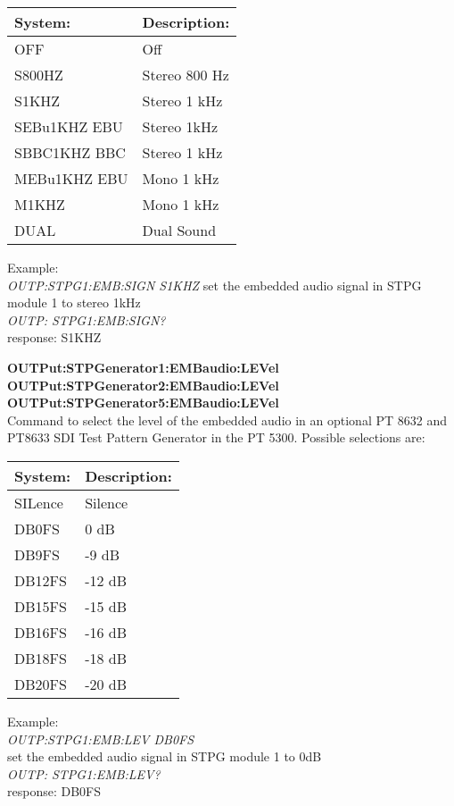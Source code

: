 \begin{tabular}{|l|l|}
\hline
System:		& Description: \\ \hline
OFF				& Off \\ \hline
S800HZ		& Stereo 800 Hz \\ \hline 
S1KHZ			& Stereo 1 kHz\\ \hline
SEBu1KHZ EBU	& Stereo 1kHz\\ \hline
SBBC1KHZ BBC	& Stereo 1 kHz\\ \hline
MEBu1KHZ EBU	& Mono 1 kHz\\ \hline
M1KHZ			& Mono 1 kHz\\ \hline
DUAL			& Dual Sound\\ \hline
\end{tabular}

Example:\\
\textit{OUTP:STPG1:EMB:SIGN S1KHZ}
set the embedded audio signal in STPG module 1 to stereo 1kHz\\
\textit{OUTP: STPG1:EMB:SIGN?}\\
response: S1KHZ

\textbf{OUTPut:STPGenerator1:EMBaudio:LEVel}\\
\textbf{OUTPut:STPGenerator2:EMBaudio:LEVel}\\
\textbf{OUTPut:STPGenerator5:EMBaudio:LEVel}\\
Command to select the level of the embedded audio in an optional PT 8632 and PT8633 SDI Test Pattern Generator in the PT 5300. Possible selections are:

\begin{tabular}{|l|l|}
\hline
System:		& Description: \\ \hline
SILence		& Silence\\ \hline
DB0FS			& 0 dB\\ \hline
DB9FS			& -9 dB\\ \hline
DB12FS		& -12 dB\\ \hline
DB15FS		& -15 dB\\ \hline
DB16FS		& -16 dB\\ \hline
DB18FS		& -18 dB\\ \hline
DB20FS		& -20 dB\\ \hline
\end{tabular}

Example:\\
\textit{OUTP:STPG1:EMB:LEV DB0FS}\\
set the embedded audio signal in STPG module 1 to 0dB\\
\textit{OUTP: STPG1:EMB:LEV?}\\
response: DB0FS

